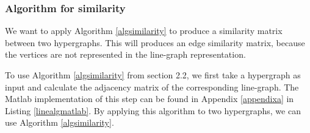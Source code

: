\documentclass[a4paper,11pt]{report}
\begin{document}
\subsubsection{Algorithm for similarity}
We want to apply Algorithm \ref{algsimilarity} to produce a similarity matrix
between two hypergraphs. This will produces an edge similarity matrix, because the vertices are not represented in the line-graph representation. 


To use Algorithm \ref{algsimilarity} from section 2.2, we first take a hypergraph as input and calculate the adjacency matrix of 
the corresponding line-graph. The Matlab implementation of this step can be found in Appendix \ref{appendixa} in Listing \ref{linealgmatlab}. By applying this algorithm to two hypergraphs, we 
can use Algorithm \ref{algsimilarity}. 
\end{document}
